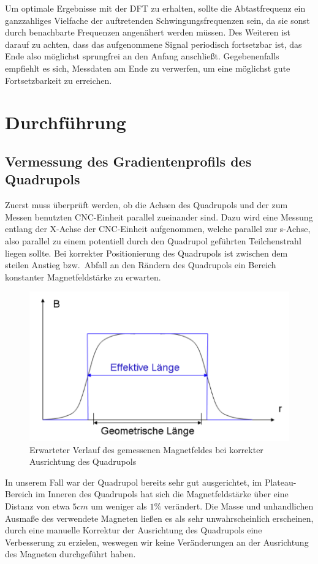\documentclass[bigchapter,colorback,accentcolor=tud4b,linedtoc,11pt]{tudreport}
\begin{document}
Um optimale Ergebnisse mit der DFT zu erhalten, sollte die Abtastfrequenz ein ganzzahliges Vielfache der auftretenden Schwingungsfrequenzen sein, da sie sonst durch benachbarte Frequenzen angenähert werden müssen. Des Weiteren ist darauf zu achten, dass das aufgenommene Signal periodisch fortsetzbar ist, das Ende also möglichst sprungfrei an den Anfang anschließt. Gegebenenfalls empfiehlt es sich, Messdaten am Ende zu verwerfen, um eine möglichst gute Fortsetzbarkeit zu erreichen.
\chapter{Durchführung}
\section{Vermessung des Gradientenprofils des Quadrupols}

Zuerst muss überprüft werden, ob die Achsen des Quadrupols und der zum Messen benutzten CNC-Einheit parallel zueinander sind. Dazu wird eine Messung entlang der X-Achse der CNC-Einheit aufgenommen, welche parallel zur s-Achse, also parallel zu einem potentiell durch den Quadrupol geführten Teilchenstrahl liegen sollte. Bei korrekter Positionierung des Quadrupols ist zwischen dem steilen Anstieg bzw.\ Abfall an den Rändern des Quadrupols ein Bereich konstanter Magnetfeldstärke zu erwarten.
\begin{figure}[H]
\centering
\includegraphics[width=130mm]{img/magnetfeldplateau.png}
\caption{Erwarteter Verlauf des gemessenen Magnetfeldes bei korrekter Ausrichtung des Quadrupols \cite{anleitung}}
\end{figure}
In unserem Fall war der Quadrupol bereits sehr gut ausgerichtet, im Plateau-Bereich im Inneren des Quadrupols hat sich die Magnetfeldstärke über eine Distanz von etwa $5 cm$ um weniger als $1\%$ verändert. Die Masse und unhandlichen Ausmaße des verwendete Magneten ließen es als sehr unwahrscheinlich erscheinen, durch eine manuelle Korrektur der Ausrichtung des Quadrupols eine Verbesserung zu erzielen, weswegen wir keine Veränderungen an der Ausrichtung des Magneten durchgeführt haben.
\end{document}
